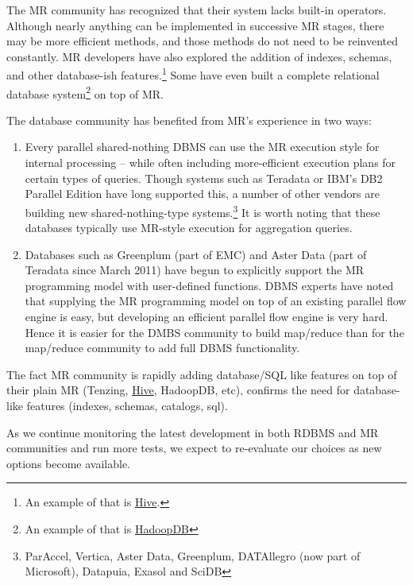 \documentclass[DM,lsstdraft,toc]{lsstdoc}
\begin{document}
The MR community has recognized that their system lacks built-in
operators. Although nearly anything can be implemented in successive MR
stages, there may be more efficient methods, and those methods do not
need to be reinvented constantly. MR developers have also explored the
addition of indexes, schemas, and other database-ish features.\footnote{An
  example of that is \href{http://wiki.apache.org/hadoop/Hive}{Hive}.}
Some have even built a complete relational database system\footnote{An
  example of that is
  \href{http://db.cs.yale.edu/hadoopdb/hadoopdb.html}{HadoopDB}} on top
of MR.

The database community has benefited from MR's experience in two ways:

\begin{enumerate}
\def\labelenumi{\arabic{enumi}.}
\item
  Every parallel shared-nothing DBMS can use the MR execution style for
  internal processing -- while often including more-efficient execution
  plans for certain types of queries. Though systems such as Teradata or
  IBM's DB2 Parallel Edition have long supported this, a number of other
  vendors are building new shared-nothing-type systems.\footnote{ParAccel,
    Vertica, Aster Data, Greenplum, DATAllegro (now part of Microsoft),
    Datapuia, Exasol and SciDB} It is worth noting that these databases
  typically use MR-style execution for aggregation queries.
\item
  Databases such as Greenplum (part of EMC) and Aster Data (part of
  Teradata since March 2011) have begun to explicitly support the MR
  programming model with user-defined functions. DBMS experts have noted
  that supplying the MR programming model on top of an existing parallel
  flow engine is easy, but developing an efficient parallel flow engine
  is very hard. Hence it is easier for the DMBS community to build
  map/reduce than for the map/reduce community to add full DBMS
  functionality.
\end{enumerate}

The fact MR community is rapidly adding database/SQL like features on
top of their plain MR (Tenzing,
\href{http://wiki.apache.org/hadoop/Hive}{Hive}, HadoopDB, etc),
confirms the need for database-like features (indexes, schemas,
catalogs, sql).

As we continue monitoring the latest development in both RDBMS and MR
communities and run more tests, we expect to re-evaluate our choices as
new options become available.
\end{document}

